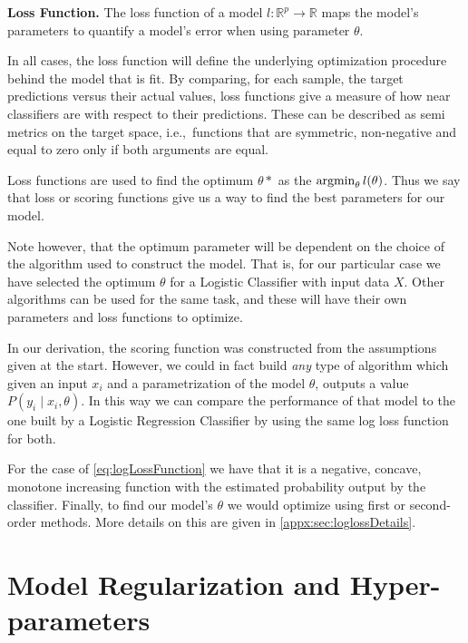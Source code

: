 \begin{definition}{\textbf{Loss Function.}}
The loss function of a model $l: \mathbb{R}^{ p} \rightarrow  \mathbb{R} $ maps the model's parameters to quantify a model's error when using parameter $\theta$.
\end{definition}

In all cases, the loss function will define the underlying optimization procedure behind the model that is fit.
By comparing, for each sample, the target predictions versus their actual values, loss functions give a measure of how near classifiers are with respect to their predictions.
These can be described as semi metrics on the target space, i.e.,\ functions that are symmetric, non-negative and equal to zero only if both arguments are equal.

Loss functions are used to find the optimum $\theta*$ as the $\operatorname*{argmin}_{\theta} l(\theta) $.
Thus we say that loss or scoring functions give us a way to find the best parameters for our model.

Note however, that the optimum parameter will be dependent on the choice of the algorithm used to construct the model.
That is, for our particular case we have selected the optimum $\theta$ for a Logistic Classifier with input data $X$.
Other algorithms can be used for the same task, and these will have their own parameters and loss functions to optimize.

In our derivation, the scoring function was constructed from the assumptions given at the start.
However, we could in fact build \textit{any} type of algorithm which given an input $x_i$ and a parametrization of the model $\theta$, outputs a value $P(y_i \mid x_i,\theta)$.
In this way we can compare the performance of that model to the one built by a Logistic Regression Classifier by using the same log loss function for both.

For the case of \cref{eq:logLossFunction} we have that it is a negative, concave, monotone increasing function with the estimated probability output by the classifier.
Finally, to find our model's $\theta$ we would optimize using first or second-order methods. More details on this are given in \cref{appx:sec:loglossDetails}.


\section{Model Regularization and Hyper-parameters}\label{section-hyperParametersRegularization}


